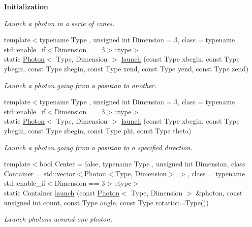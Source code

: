 \begin{Indent}{\bf Initialization}
\begin{DoxyCompactItemize}
\begin{DoxyCompactList}\small\item\em Launch a photon in a serie of cones. \end{DoxyCompactList}\item 
{\footnotesize template$<$typename Type , unsigned int Dimension = 3, class  = typename std\-::enable\-\_\-if$<$\-Dimension == 3$>$\-::type$>$ }\\static \hyperlink{exceptionPhoton}{Photon}$<$ Type, Dimension $>$ \hyperlink{exceptionIntegrator_a4c403c0175db5350c68d8147a623b41d}{launch} (const Type xbegin, const Type ybegin, const Type zbegin, const Type xend, const Type yend, const Type zend)
\begin{DoxyCompactList}\small\item\em Launch a photon going from a position to another. \end{DoxyCompactList}\item 
{\footnotesize template$<$typename Type , unsigned int Dimension = 3, class  = typename std\-::enable\-\_\-if$<$\-Dimension == 3$>$\-::type$>$ }\\static \hyperlink{exceptionPhoton}{Photon}$<$ Type, Dimension $>$ \hyperlink{exceptionIntegrator_af311ebd7e6c2029f95b28f472c8cfd91}{launch} (const Type xbegin, const Type ybegin, const Type zbegin, const Type phi, const Type theta)
\begin{DoxyCompactList}\small\item\em Launch a photon going from a position to a specified direction. \end{DoxyCompactList}\item 
{\footnotesize template$<$bool Center = false, typename Type , unsigned int Dimension, class Container  = std\-::vector$<$\-Photon$<$\-Type, Dimension$>$ $>$, class  = typename std\-::enable\-\_\-if$<$\-Dimension == 3$>$\-::type$>$ }\\static Container \hyperlink{exceptionIntegrator_a2ba2f81cae1ab9e7763093ace0af1a47}{launch} (const \hyperlink{exceptionPhoton}{Photon}$<$ Type, Dimension $>$ \&photon, const unsigned int count, const Type angle, const Type rotation=Type())
\begin{DoxyCompactList}\small\item\em Launch photons around one photon. \end{DoxyCompactList}\end{DoxyCompactItemize}
\end{Indent}
